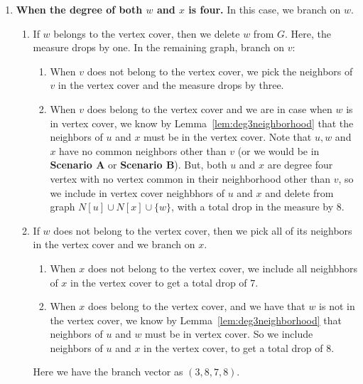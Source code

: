 \documentclass[svgnames]{llncs}
\begin{document}
{\begin{enumerate}[series=scenarioC,label=\bfseries Case~\arabic*:]
\item {\bf When the degree of both $w$ and $x$ is four.}
In this case, we branch on $w$. 
\begin{enumerate}
\item If $w$ belongs to the vertex cover, then we delete $w$ from $G$. Here, the measure drops by one. In the remaining graph, branch on $v$:
\begin{enumerate}
\item When $v$ does not belong to the vertex cover, we pick the neighbors of $v$ in the vertex cover and the measure drops by three. 
\item When $v$ does belong to the vertex cover and we are in case when $w$ is in vertex cover, we know by Lemma~\ref{lem:deg3neighborhood} that the neighbors of $u$ and $x$ must be in the vertex cover. 
 Note that $u, w$ and $x$ have no common neighbors other than $v$ (or we would be in {\bf Scenario A} or {\bf Scenario B}). 
But, both $u$ and $x$ are degree four vertex with no vertex common in their neighborhood other than $v$, so we include in vertex cover neighbhors of $u$ and $x$ and delete from graph $N[u]\cup N[x]\cup \{w\}$,
with a total drop in the measure by 8.
\end{enumerate}    
\item If $w$ does not belong to the vertex cover, then we pick all of its neighbors in the vertex cover and we branch on $x$.
\begin{enumerate}
 \item When $x$ does not belong to the vertex cover, we include all neighbhors of $x$ in the vertex cover to get a total drop of $7$.
 \item When $x$ does belong to the vertex cover, and we have that $w$ is not in the vertex cover, we know by Lemma~\ref{lem:deg3neighborhood} that neighbors of $u$ and $w$ must be in vertex cover. So we include
 neighbors of $u$ and $x$ in the vertex cover, to get a total drop of $8$.
\end{enumerate}

Here we have the branch vector as $(3,8,7,8)$.
\end{enumerate}


\end{enumerate}


}
\end{document}
